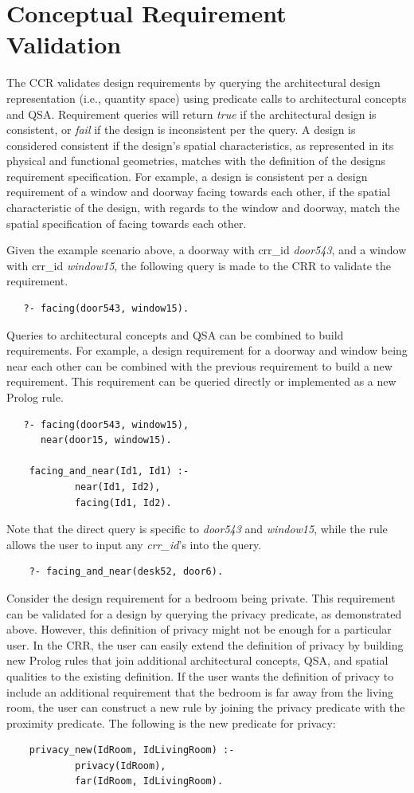 \documentclass[12pt]{ucthesis}
\begin{document}
\section{Conceptual Requirement Validation}
The CCR validates design requirements by querying the architectural design representation (i.e., quantity space) using predicate calls to architectural concepts and QSA. Requirement queries will return \emph{true} if the architectural design is consistent, or \emph{fail} if the design is inconsistent per the query. A design is considered consistent if the design's spatial characteristics, as represented in its physical and functional geometries, matches with the definition of the designs requirement specification. For example, a design is consistent per a design requirement of a window and doorway facing towards each other, if the spatial characteristic of the design, with regards to the window and doorway, match the spatial specification of facing towards each other.    

Given the example scenario above, a doorway with crr\_id \emph{door543}, and a window with crr\_id \emph{window15}, the following query is made to the CRR to validate the requirement.
\begin{verbatim}
   ?- facing(door543, window15).
\end{verbatim}
Queries to architectural concepts and QSA can be combined to build requirements. For example, a design requirement for a doorway and window being near each other can be combined with the previous requirement to build a new requirement. This requirement can be queried directly or implemented as a new Prolog rule. 
\begin{verbatim}
   ?- facing(door543, window15),
      near(door15, window15).
      
    facing_and_near(Id1, Id1) :-
            near(Id1, Id2),
            facing(Id1, Id2).
\end{verbatim}
Note that the direct query is specific to \emph{door543} and \emph{window15}, while the rule allows the user to input any \emph{crr\_id}'s into the query.
\begin{verbatim}
    ?- facing_and_near(desk52, door6).
\end{verbatim}

Consider the design requirement for a bedroom being private. This requirement can be validated for a design by querying the privacy predicate, as demonstrated above. However, this definition of privacy might not be enough for a particular user. In the CRR, the user can easily extend the definition of privacy by building new Prolog rules that join additional architectural concepts, QSA, and spatial qualities to the existing definition. If the user wants the definition of privacy to include an additional requirement that the bedroom is far away from the living room, the user can construct a new rule by joining the privacy predicate with the proximity predicate. The following is the new predicate for privacy:
\begin{verbatim}
    privacy_new(IdRoom, IdLivingRoom) :-
            privacy(IdRoom),
            far(IdRoom, IdLivingRoom).
\end{verbatim}
\end{document}

